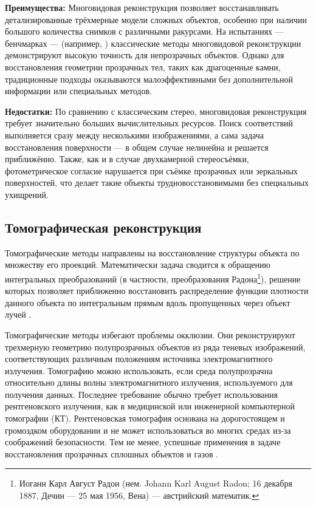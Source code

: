 \textbf{Преимущества:} Многовидовая реконструкция позволяет восстанавливать
детализированные трёхмерные модели сложных объектов, особенно при наличии
большого количества снимков с различными ракурсами. На испытаниях — бенчмарках —
(например, \cite{Knapitsch2017}) классические методы многовидовой реконструкции
демонстрируют высокую точность для непрозрачных объектов. Однако для
восстановления геометрии прозрачных тел, таких как драгоценные камни,
традиционные подходы оказываются малоэффективными без дополнительной информации
или специальных методов.

\textbf{Недостатки:} По сравнению с классическим стерео, многовидовая
реконструкция требует значительно больших вычислительных ресурсов. Поиск
соответствий выполняется сразу между несколькими изображениями, а сама задача
восстановления поверхности — в общем случае нелинейна и решается приближённо.
Также, как и в случае двухкамерной стереосъёмки, фотометрическое согласие
нарушается при съёмке прозрачных или зеркальных поверхностей, что делает такие
объекты трудновосстановимыми без специальных ухищрений.

\subsection{Томографическая реконструкция}

Томографические методы направлены на восстановление структуры объекта
по множеству его проекций. Математически задача сводится к
обращению интегральных преобразований (в частности, преобразования
Радона\footnote{ Иоганн Карл Август Радон (нем. Johann Karl August Radon; 16
декабря 1887, Дечин — 25 мая 1956, Вена) — австрийский математик.  }), решение
которых позволяет приближенно восстановить распределение функции плотности
данного объекта по интегральным прямым вдоль пропущенных через объект лучей
\cite{book:869357}.

Томографические методы избегают проблемы окклюзии. Они реконструируют трехмерную
геометрию полупрозрачных объектов из ряда теневых изображений, соответствующих
различным положениям источника электромагнитного излучения. Томографию можно
использовать, если среда полупрозрачна относительно длины волны
электромагнитного излучения, используемого для получения данных.  Последнее
требование обычно требует использования рентгеновского излучения, как в
медицинской или инженерной компьютерной томографии (КТ). Рентгеновская
томография основана на дорогостоящем и громоздком оборудовании и не может
использоваться во многих средах из-за соображений безопасности. Тем не менее,
успешные применения в задаче восстановления прозрачных сплошных объектов
\cite{10.1145/1179849.1179918} и газов \cite{IHRKE2006484}.


